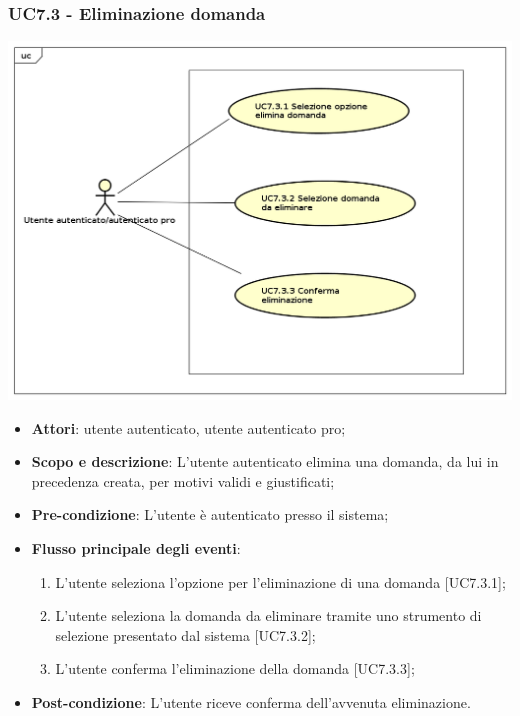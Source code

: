 	\subsubsection{UC7.3 - Eliminazione domanda}	
	\begin{center}
		\includegraphics[scale=0.5]{UML/UC7.3.png}
	\end{center}
	\begin{itemize}
		\item
			\textbf{Attori}: utente autenticato, utente autenticato pro;
		\item		
			\textbf{Scopo e descrizione}: L'utente autenticato elimina una domanda, da lui in precedenza creata, per motivi validi e giustificati;
		\item
			\textbf{Pre-condizione}: L'utente è autenticato presso il sistema;
		\item
			\textbf{Flusso principale degli eventi}:
	       		\begin{enumerate}
					\item 	
					L'utente seleziona l'opzione per l'eliminazione di una domanda [UC7.3.1];
					\item
					L'utente seleziona la domanda da eliminare tramite uno strumento di selezione presentato dal sistema [UC7.3.2];
					\item
					L'utente conferma l'eliminazione della domanda [UC7.3.3];
	 			\end{enumerate}
		\item
			\textbf{	Post-condizione}: L'utente riceve conferma dell'avvenuta eliminazione.
	\end{itemize}
